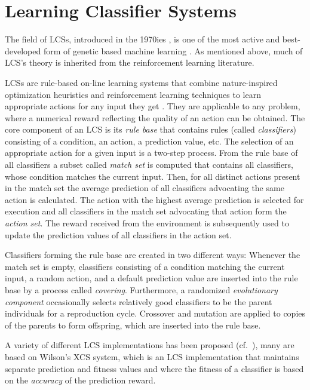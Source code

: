 \section{Learning Classifier Systems}
\label{section:learning-classifier-systems}

The field of LCSs, introduced in the 1970ies \cite{Hol75,Hol76,HR78}, is one of the most active and best-developed form of genetic based machine learning \cite{Kov02a,KL00,Lan08}. As mentioned above, much of LCS's theory is inherited from the reinforcement learning literature. %

LCSs are rule-based on-line learning systems that combine nature-inspired optimization heuristics and reinforcement learning techniques to learn appropriate actions for any input they get \cite{Wil95}. They are applicable to any problem, where a numerical reward reflecting the quality of an action can be obtained. The core component of an LCS is its \emph{rule base} that contains rules (called \emph{classifiers}) consisting of a condition, an action, a prediction value, etc. The selection of an appropriate action for a given input is a two-step process. From the rule base of all classifiers a subset called \emph{match set} is computed that contains all classifiers, whose condition matches the current input. Then, for all distinct actions present in the match set the average prediction of all classifiers advocating the same action is calculated. The action with the highest average prediction is selected for execution and all classifiers in the match set advocating that action form the \emph{action set}. The reward received from the environment is subsequently used to update the prediction values of all classifiers in the action set.

Classifiers forming the rule base are created in two different ways: Whenever the match set is empty, classifiers consisting of a condition matching the current input, a random action, and a default prediction value are inserted into the rule base by a process called \emph{covering}. Furthermore, a randomized \emph{evolutionary component} occasionally selects relatively good classifiers to be the parent individuals for a reproduction cycle. Crossover and mutation are applied to copies of the parents to form offspring, which are inserted into the rule base. 

A variety of different LCS implementations has been proposed (cf.~\cite{Kov02a}), many are based on Wilson's XCS \cite{Wil95} system, which is an LCS implementation that maintains separate prediction and fitness values and where the fitness of a classifier is based on the \emph{accuracy} of the prediction reward.  

